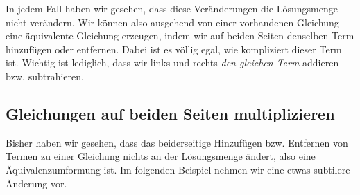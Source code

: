 \documentclass[../../main.tex]{subfiles}
\begin{document}
In jedem Fall haben wir gesehen, dass diese Veränderungen die Lösungsmenge nicht verändern. Wir können also ausgehend von einer vorhandenen Gleichung eine äquivalente Gleichung erzeugen, indem wir auf beiden Seiten denselben Term hinzufügen oder entfernen. Dabei ist es völlig egal, wie kompliziert dieser Term ist. Wichtig ist lediglich, dass wir links und rechts \emph{den gleichen Term} addieren bzw. subtrahieren.

\subsection{Gleichungen auf beiden Seiten multiplizieren}

Bisher haben wir gesehen, dass das beiderseitige Hinzufügen bzw. Entfernen von Termen zu einer Gleichung nichts an der Lösungsmenge ändert, also eine Äquivalenzumformung ist. Im folgenden Beispiel nehmen wir eine etwas subtilere Änderung vor.
\end{document}
